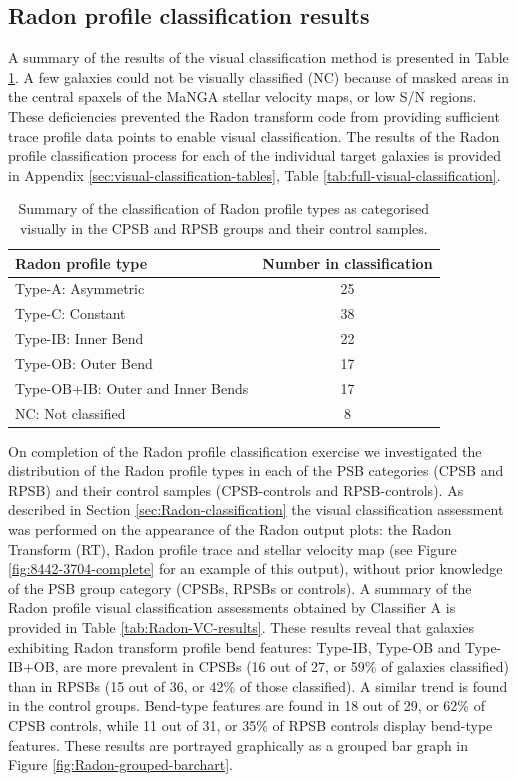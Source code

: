 \subsection{Radon profile classification results}
\label{sec:Radon-profile-classification}

A summary of the results of the visual classification method is presented in Table \ref{tab:Radon-class-summary}.  A few galaxies could not be visually classified (NC) because of masked areas in the central spaxels of the MaNGA stellar velocity maps, or low S/N regions. These deficiencies prevented the Radon transform code from providing sufficient trace profile data points to enable visual classification. The results of the Radon profile classification process for each of the individual target galaxies is provided in Appendix \ref{sec:visual-classification-tables}, Table \ref{tab:full-visual-classification}. 

\begin{table}
    \centering
    \caption[Summary of Radon profile type visual classifications]{Summary of the classification of Radon profile types as categorised visually in the CPSB and RPSB groups and their control samples.}
    \label{tab:Radon-class-summary}
    \begin{tabular}{lc}
    \hline
    Radon profile type & Number in classification \\
    \hline
    Type-A: Asymmetric & 25 \\
    Type-C: Constant & 38 \\
    Type-IB: Inner Bend & 22 \\
    Type-OB: Outer Bend & 17 \\
    Type-OB+IB: Outer and Inner Bends & 17 \\
    NC: Not classified & 8 \\
    \hline
    \end{tabular}
\end{table}

On completion of the Radon profile classification exercise we investigated the distribution of the Radon profile types in each of the PSB categories (CPSB and RPSB) and their control samples (CPSB-controls and RPSB-controls). As described in Section \ref{sec:Radon-classification} the visual classification assessment was performed on the appearance of the Radon output plots: the Radon Transform (RT), Radon profile trace and stellar velocity map (see Figure \ref{fig:8442-3704-complete} for an example of this output), without prior knowledge of the PSB group category (CPSBs, RPSBs or controls). A summary of the Radon profile visual classification assessments obtained by Classifier A is provided in Table \ref{tab:Radon-VC-results}. These results reveal that galaxies exhibiting Radon transform profile bend features: Type-IB, Type-OB and Type-IB+OB, are more prevalent in CPSBs (16 out of 27, or 59\% of galaxies classified) than in RPSBs (15 out of 36, or 42\% of those classified). A similar trend is found in the control groups. Bend-type features are found in 18 out of 29, or 62\% of CPSB controls, while 11 out of 31, or 35\% of RPSB controls display bend-type features. These results are portrayed graphically as a grouped bar graph in Figure \ref{fig:Radon-grouped-barchart}.

